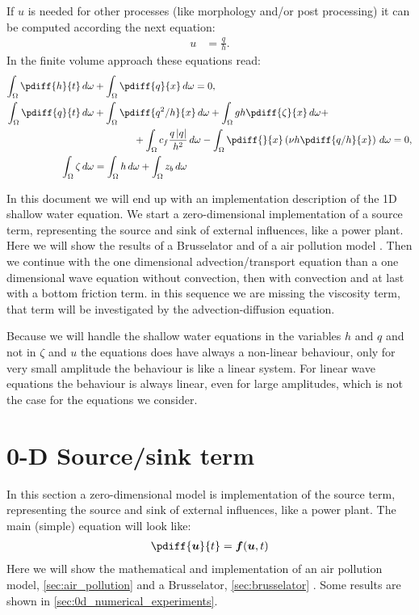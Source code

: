 If $u$ is needed for other processes (like morphology and/or post processing) it can be computed according the next equation:
\begin{align}
    u & = \frac{q}{h}.
\end{align}
In the finite volume approach these equations read:
\begin{subequations}
    \begin{align}
        \int_\Omega \pdiff{h}{t}\, d\omega & +\int_\Omega \pdiff{q}{x}\, d\omega=0,
        \\
        \int_\Omega \pdiff{q}{t}\, d\omega & + \int_\Omega \pdiff{q^2/h}{x}\, d\omega + \int_\Omega gh \pdiff{\zeta}{x}\, d\omega  +
        \nonumber \\*
        & \qquad \qquad + \int_{\Omega} c_f\frac{q\abs{q}}{h^2} \, d\omega - \int_{\Omega} \pdiff{}{x}\left( \nu h \pdiff{q/h}{x}\right) \, d\omega= 0,
        \\
        \int_\Omega \zeta\, d\omega & = \int_\Omega h\, d\omega + \int_\Omega z_b\, d\omega
    \end{align}
\end{subequations}

In this document we will end up with an implementation description of the 1D shallow water equation.
We start a zero-dimensional implementation of a source term, representing the source and sink of external influences, like a power plant.
Here we will show the results of a Brusselator \citep{AultHolmgreen2003} and of a air pollution model \citep[ex.\ 1.1 pg.\ 7]{HundsdorferAndVerwer2003}.
Then we continue with the one dimensional advection/transport equation than a one dimensional wave equation without convection, then with convection and at last with a bottom friction term.
in this sequence we are missing the viscosity term, that term will be investigated by the advection-diffusion equation.

Because we will handle the shallow water equations in the variables $h$ and  $q$ and not in $\zeta$ and $u$ the equations does have always a non-linear behaviour, only for very small amplitude the behaviour is like a linear system.
For linear wave equations the behaviour is always linear, even for large amplitudes, which is not the case for the equations we consider.
\section{0-D Source/sink term }\label{sec:0d_source_and_sink}
In this section a zero-dimensional model is implementation of the source term, representing the source and sink of external influences, like a power plant.
The main (simple) equation will look like:
\begin{align}
    \pdiff{\vec{u}}{t} = \vec{f}(\vec{u},t)
\end{align}
Here we will show the mathematical and implementation of an air pollution model, \autoref{sec:air_pollution} \citep[ex.\ 1.1 pg.\ 7]{HundsdorferAndVerwer2003} and a Brusselator, \autoref{sec:brusselator}  \citep{AultHolmgreen2003}.
Some results are shown in \autoref{sec:0d_numerical_experiments}.
